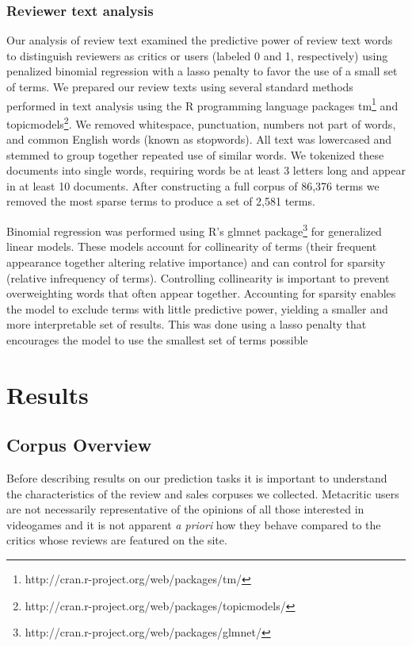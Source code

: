 \documentclass[letterpaper]{article}
\begin{document}
\subsubsection{Reviewer text analysis}
Our analysis of review text examined the predictive power of review text words to distinguish reviewers as critics or users (labeled 0 and 1, respectively) using penalized binomial regression with a lasso penalty to favor the use of a small set of terms. 
We prepared our review texts using several standard methods performed in text analysis using the R programming language packages tm\footnote{http://cran.r-project.org/web/packages/tm/} and topicmodels\footnote{http://cran.r-project.org/web/packages/topicmodels/}. We removed whitespace, punctuation, numbers not part of words, and common English words (known as stopwords). All text was lowercased and stemmed to group together repeated use of similar words. We tokenized these documents into single words, requiring words be at least 3 letters long and appear in at least 10 documents. After constructing a full corpus of 86,376 terms we removed the most sparse terms to produce a set of 2,581 terms.

Binomial regression was performed using R's glmnet package\footnote{http://cran.r-project.org/web/packages/glmnet/} for generalized linear models. These models account for collinearity of terms (their frequent appearance together altering relative importance) and can control for sparsity (relative infrequency of terms). Controlling collinearity is important to prevent overweighting words that often appear together. Accounting for sparsity enables the model to exclude terms with little predictive power, yielding a smaller and more interpretable set of results. This was done using a lasso penalty that encourages the model to use the smallest set of terms possible


\section{Results}

\subsection{Corpus Overview}
Before describing results on our prediction tasks it is important to understand the characteristics of the review and sales corpuses we collected. Metacritic users are not necessarily representative of the opinions of all those interested in videogames and it is not apparent \textit{a priori} how they behave compared to the critics whose reviews are featured on the site.
\end{document}
